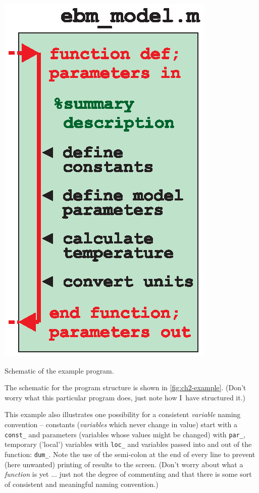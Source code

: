 \documentclass{tufte-book} %
\begin{document}
\begin{marginfigure}[0.0in]
\includegraphics[width=\linewidth]{ch2-example.eps}
\caption{Schematic of the example program.}
\label{fig:ch2-example}
\end{marginfigure}

\noindent The schematic for the program structure is shown in \ref{fig:ch2-example}. (Don't worry what this particular program does, just note how I\ have structured it.)
 
This example also illustrates one possibility for a consistent \textit{variable} naming convention -- constants (\textit{variables} which never change in value) start with a \texttt{const\_} and parameters (variables whose values might be changed) with \texttt{par\_}, temporary ('local') variables with \texttt{loc\_} and variables passed into and out of the function: \texttt{dum\_}. Note the use of the semi-colon at the end of every line to prevent (here unwanted) printing of results to the screen. (Don't worry about what a \textit{function} is yet ... just not the degree of commenting and that there is some sort of consistent and meaningful naming convention.)
\end{document}
